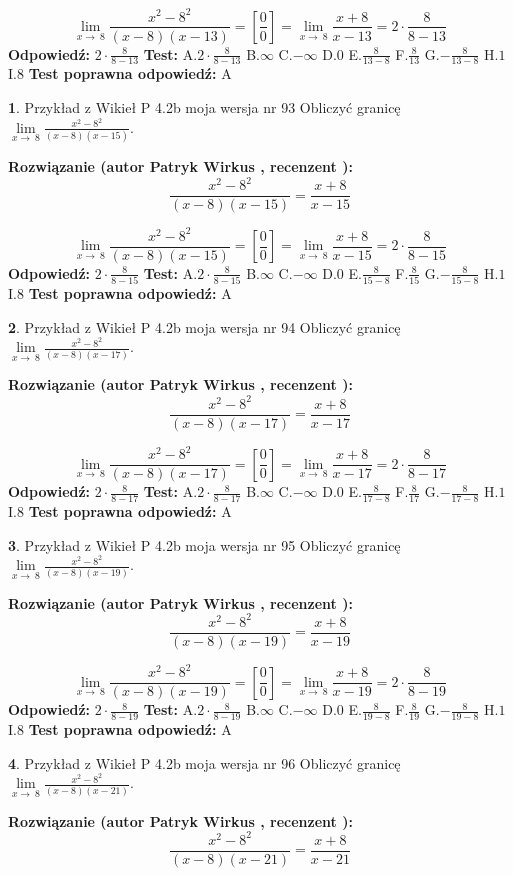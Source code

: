\documentclass[12pt, a4paper]{article}
\theoremstyle{definition} %
\newtheorem{zad}{}
\newcommand{\zadStart}[1]{\begin{zad}#1\newline}
\newcommand{\zadStop}{\end{zad}}
\newcommand{\rozwStart}[2]{\noindent \textbf{Rozwiązanie (autor #1 , recenzent #2): }\newline}
\newcommand{\rozwStop}{\newline}
\newcommand{\odpStart}{\noindent \textbf{Odpowiedź:}\newline}
\newcommand{\odpStop}{\newline}
\newcommand{\testStart}{\noindent \textbf{Test:}\newline}
\newcommand{\testStop}{\newline}
\newcommand{\kluczStart}{\noindent \textbf{Test poprawna odpowiedź:}\newline}
\newcommand{\kluczStop}{\newline}
\begin{document}
$$\lim\limits_{x\to\ 8}\frac{x^{2}-8^{2}}{(x-8)(x-13)}=[\frac{0}{0}]=\lim\limits_{x\to\ 8}\frac{x+8}{x-13}=2 \cdot \frac{8}{8-13}$$
\rozwStop
\odpStart
$2 \cdot \frac{8}{8-13}$
\odpStop
\testStart
A.$2 \cdot \frac{8}{8-13}$
B.$\infty$
C.$-\infty$
D.$0$
E.$\frac{8}{13-8}$
F.$\frac{8}{13}$
G.$-\frac{8}{13-8}$
H.$1$
I.$8$
\testStop
\kluczStart
A
\kluczStop



\zadStart{Przykład z Wikieł P 4.2b moja wersja nr 93}
Obliczyć granicę $\lim\limits_{x\to\ 8}\frac{x^{2}-8^{2}}{(x-8)(x-15)}$.
\zadStop
\rozwStart{Patryk Wirkus}{}
$$\frac{x^{2}-8^{2}}{(x-8)(x-15)}=\frac{x+8}{x-15}$$

$$\lim\limits_{x\to\ 8}\frac{x^{2}-8^{2}}{(x-8)(x-15)}=[\frac{0}{0}]=\lim\limits_{x\to\ 8}\frac{x+8}{x-15}=2 \cdot \frac{8}{8-15}$$
\rozwStop
\odpStart
$2 \cdot \frac{8}{8-15}$
\odpStop
\testStart
A.$2 \cdot \frac{8}{8-15}$
B.$\infty$
C.$-\infty$
D.$0$
E.$\frac{8}{15-8}$
F.$\frac{8}{15}$
G.$-\frac{8}{15-8}$
H.$1$
I.$8$
\testStop
\kluczStart
A
\kluczStop



\zadStart{Przykład z Wikieł P 4.2b moja wersja nr 94}
Obliczyć granicę $\lim\limits_{x\to\ 8}\frac{x^{2}-8^{2}}{(x-8)(x-17)}$.
\zadStop
\rozwStart{Patryk Wirkus}{}
$$\frac{x^{2}-8^{2}}{(x-8)(x-17)}=\frac{x+8}{x-17}$$

$$\lim\limits_{x\to\ 8}\frac{x^{2}-8^{2}}{(x-8)(x-17)}=[\frac{0}{0}]=\lim\limits_{x\to\ 8}\frac{x+8}{x-17}=2 \cdot \frac{8}{8-17}$$
\rozwStop
\odpStart
$2 \cdot \frac{8}{8-17}$
\odpStop
\testStart
A.$2 \cdot \frac{8}{8-17}$
B.$\infty$
C.$-\infty$
D.$0$
E.$\frac{8}{17-8}$
F.$\frac{8}{17}$
G.$-\frac{8}{17-8}$
H.$1$
I.$8$
\testStop
\kluczStart
A
\kluczStop



\zadStart{Przykład z Wikieł P 4.2b moja wersja nr 95}
Obliczyć granicę $\lim\limits_{x\to\ 8}\frac{x^{2}-8^{2}}{(x-8)(x-19)}$.
\zadStop
\rozwStart{Patryk Wirkus}{}
$$\frac{x^{2}-8^{2}}{(x-8)(x-19)}=\frac{x+8}{x-19}$$

$$\lim\limits_{x\to\ 8}\frac{x^{2}-8^{2}}{(x-8)(x-19)}=[\frac{0}{0}]=\lim\limits_{x\to\ 8}\frac{x+8}{x-19}=2 \cdot \frac{8}{8-19}$$
\rozwStop
\odpStart
$2 \cdot \frac{8}{8-19}$
\odpStop
\testStart
A.$2 \cdot \frac{8}{8-19}$
B.$\infty$
C.$-\infty$
D.$0$
E.$\frac{8}{19-8}$
F.$\frac{8}{19}$
G.$-\frac{8}{19-8}$
H.$1$
I.$8$
\testStop
\kluczStart
A
\kluczStop



\zadStart{Przykład z Wikieł P 4.2b moja wersja nr 96}
Obliczyć granicę $\lim\limits_{x\to\ 8}\frac{x^{2}-8^{2}}{(x-8)(x-21)}$.
\zadStop
\rozwStart{Patryk Wirkus}{}
$$\frac{x^{2}-8^{2}}{(x-8)(x-21)}=\frac{x+8}{x-21}$$
\end{document}
